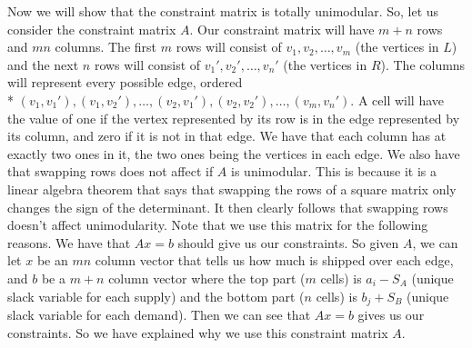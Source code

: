 \documentclass{article}
\begin{document}
\begin{description}
        \vspace{5mm}

        Now we will show that the constraint matrix is totally unimodular. So,
        let us consider the constraint matrix $A$. Our constraint matrix will
        have $m + n$ rows and $mn$ columns. The first $m$ rows will consist of
        $v_1, v_2, \dots, v_m$ (the vertices in $L$) and the next $n$ rows will consist of
        $v_1', v_2', \dots, v_n'$ (the vertices in $R$). The columns will represent
        every possible edge, ordered \\* $(v_1, v_1'), (v_1, v_2'), \dots, (v_2,
        v_1'), (v_2, v_2'), \dots, (v_m, v_n')$. A cell will have the value of one if
        the vertex represented by its row is in the edge represented by its
        column, and zero if it is not in that edge. We have that each column has
        at exactly two ones in it, the two ones being the vertices in each edge.
        We also have that swapping rows does not affect
        if $A$ is unimodular. This is because it is a linear algebra theorem that says that
        swapping the rows of a square matrix only changes the sign of the
        determinant. It then clearly follows that swapping rows doesn't affect
        unimodularity. Note that we use this matrix for the following reasons.
        We have that $Ax = b$ should give us our constraints. So given $A$, we
        can let $x$ be an $mn$ column vector that tells us how much is shipped
        over each edge, and $b$ be a $m+n$ column vector where the top part ($m$
        cells) is $a_i - S_A$ (unique slack variable for each supply) and the bottom part
        ($n$ cells) is $b_j + S_B$ (unique slack variable for each demand). Then we can see
        that $Ax = b$ gives us our constraints. So we have explained why we use this constraint
        matrix $A$.


\end{description}
\end{document}
